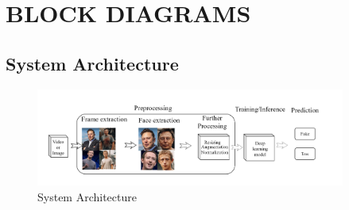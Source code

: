 \section{BLOCK DIAGRAMS}
\subsection{System Architecture}
\begin{figure}[h]
    \centering
    \includegraphics[width= 4in ]{img/systemachitecture.drawio.png}
    \caption{System Architecture}
\end{figure}
    